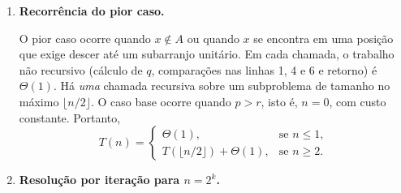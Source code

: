 \documentclass[9pt,a4paper]{extarticle}
\begin{document}
\begin{itemize}
\begin{enumerate}[label=(\alph*)]
    Seja $n = r - p + 1$ o tamanho do subarranjo corrente e $q = \lfloor (p+r)/2 \rfloor$. As duas chamadas recursivas operam sobre os subarranjos $A[p\,..\,q-1]$ e $A[q+1\,..\,r]$, cujos tamanhos são, respectivamente,
    \[
        n_{\text{esq}} = (q-1) - p + 1 = q - p, 
        \qquad
        n_{\text{dir}} = r - (q+1) + 1 = r - q.
    \]
    Substituindo $q = \lfloor (p+r)/2 \rfloor$:
    \[
        n_{\text{esq}} = \left\lfloor \frac{p+r}{2} \right\rfloor - p 
                       = \left\lfloor \frac{r-p}{2} \right\rfloor
                       = \left\lfloor \frac{n-1}{2} \right\rfloor 
                       \leq \left\lfloor \frac{n}{2} \right\rfloor,
    \]
    \[
        n_{\text{dir}} = r - \left\lfloor \frac{p+r}{2} \right\rfloor 
                       = \left\lceil \frac{r-p}{2} \right\rceil 
                       = \left\lceil \frac{n-1}{2} \right\rceil 
                       \leq \left\lfloor \frac{n}{2} \right\rfloor.
    \]
    A última desigualdade vale porque $\lceil (n-1)/2 \rceil = \lfloor n/2 \rfloor$ para todo $n \geq 1$. Assim, qualquer que seja o ramo escolhido, o subproblema tem tamanho \emph{no máximo} $\lfloor n/2 \rfloor$.
    
    \medskip
    
    \item \textbf{Recorrência do pior caso.}
    
    O pior caso ocorre quando $x \notin A$ ou quando $x$ se encontra em uma posição que exige descer até um subarranjo unitário. Em cada chamada, o trabalho não recursivo (cálculo de $q$, comparações nas linhas 1, 4 e 6 e retorno) é $\Theta(1)$. Há \emph{uma} chamada recursiva sobre um subproblema de tamanho no máximo $\lfloor n/2 \rfloor$. O caso base ocorre quando $p > r$, isto é, $n = 0$, com custo constante. Portanto,
    \[
        T(n) = 
        \begin{cases}
            \Theta(1), & \text{se } n \leq 1, \\[4pt]
            T(\lfloor n/2 \rfloor) + \Theta(1), & \text{se } n \geq 2.
        \end{cases}
    \]
    
    \medskip
    
    \item \textbf{Resolução por iteração para $n = 2^k$.}
    

\end{enumerate}
\end{itemize}
\end{document}
